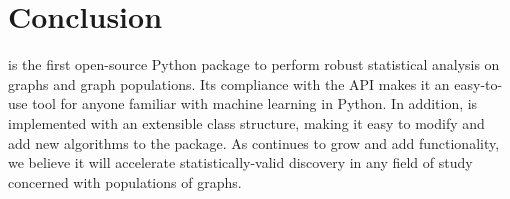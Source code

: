 \section{Conclusion}
\graspy is the first open-source Python package to perform robust statistical analysis on graphs and graph populations. Its compliance with the \sklearn API makes it an easy-to-use tool for anyone familiar with machine learning in Python. In addition, \graspy is implemented with an extensible class structure, making it easy to modify and add new algorithms to the package. As \graspy continues to grow and add functionality, we believe it will accelerate statistically-valid discovery in any field of study concerned with populations of graphs. 